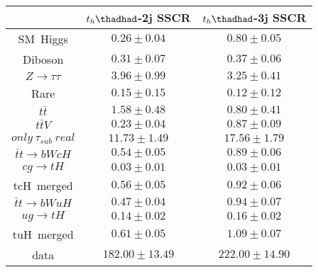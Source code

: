 \centering
\begin{tabular}{ccc} \toprule\toprule
& $t_{h}\thadhad$-2j SSCR  & $t_{h}\thadhad$-3j SSCR\\ \midrule
SM~Higgs                & $0.26\pm0.04$                        & $0.80\pm0.05$\\
Diboson                 & $0.31\pm0.07$                        & $0.37\pm0.06$\\
$Z\to\tau\tau$          & $3.96\pm0.99$                        & $3.25\pm0.41$\\
Rare                    & $0.15\pm0.15$                        & $0.12\pm0.12$\\
$t\bar{t}$              & $1.58\pm0.48$                        & $0.80\pm0.41$\\
$t\bar{t}V$             & $0.23\pm0.04$                        & $0.87\pm0.09$\\
$only~\tau_{sub}~real$  & $11.73\pm1.49$                       & $17.56\pm1.79$\\\midrule\midrule
$\bar{t}t\to bWcH$      & $0.54\pm0.05$                        & $0.89\pm0.06$\\
$cg\to tH$              & $0.03\pm0.01$                        & $0.03\pm0.01$\\
tcH~merged              & $0.56\pm0.05$                        & $0.92\pm0.06$\\
$\bar{t}t\to bWuH$      & $0.47\pm0.04$                        & $0.94\pm0.07$\\
$ug\to tH$              & $0.14\pm0.02$                        & $0.16\pm0.02$\\
tuH~merged              & $0.61\pm0.05$                        & $1.09\pm0.07$\\\midrule\midrule
data                    & $182.00\pm13.49$                     & $222.00\pm14.90$\\
\bottomrule\bottomrule
\end{tabular}